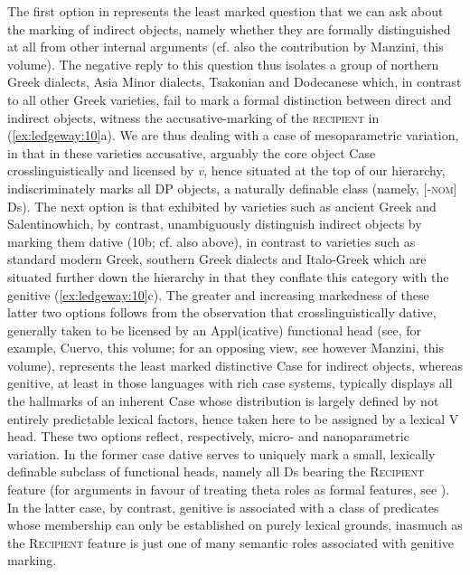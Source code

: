 \documentclass[output=paper,modfonts,nonflat,colorlinks,citecolor=brown]{langsci/langscibook}
\begin{document}
The first option in  represents the least marked question that we can ask about the marking of indirect objects, namely whether they are formally distinguished at all from other internal arguments (cf. also the contribution by Manzini, this volume). The negative reply to this question thus isolates a group of northern Greek dialects, Asia Minor dialects, Tsakonian and Dodecanese which, in contrast to all other Greek varieties, fail to mark a formal distinction between direct and indirect objects, witness the accusative-marking of the \textsc{recipient} in (\ref{ex:ledgeway:10}a). We are thus dealing with a case of mesoparametric variation, in that in these varieties accusative, arguably the core object Case crosslinguistically and licensed by \textit{v}, hence situated at the top of our hierarchy, indiscriminately marks all DP objects, a naturally definable class (namely, [-\textsc{nom}] Ds). The next option is that exhibited by varieties such as ancient Greek and Salentinowhich, by contrast, unambiguously distinguish indirect objects by marking them dative (10b; cf. also  above), in contrast to varieties such as standard modern Greek, southern Greek dialects and Italo-Greek which are situated further down the hierarchy in that they conflate this category with the genitive (\ref{ex:ledgeway:10}c). The greater and increasing markedness of these latter two options follows from the observation that crosslinguistically dative, generally taken to be licensed by an Appl(icative) functional head (see, for example, Cuervo, this volume; for an opposing view, see however Manzini, this volume), represents the least marked distinctive Case for indirect objects, whereas genitive, at least in those languages with rich case systems, typically displays all the hallmarks of an inherent Case whose distribution is largely defined by not entirely predictable lexical factors, hence taken here to be assigned by a lexical V head. These two options reflect, respectively, micro- and nanoparametric variation. In the former case dative serves to uniquely mark a small, lexically definable subclass of functional heads, namely all Ds bearing the \textsc{Recipient} feature (for arguments in favour of treating theta roles as formal features, see \citealt{Hornstein1999}). In the latter case, by contrast, genitive is associated with a class of predicates whose membership can only be established on purely lexical grounds, inasmuch as the \textsc{Recipient} feature is just one of many semantic roles associated with genitive marking. 
\end{document}
